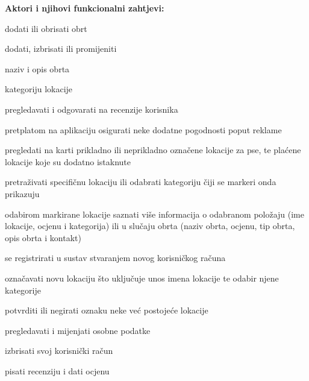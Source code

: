     \noindent \textbf{Aktori i njihovi funkcionalni zahtjevi:}
		\begin{packed_enum}
			\item  {}
			\begin{packed_enum}
				\item dodati ili obrisati obrt
                \item dodati, izbrisati ili promijeniti
				\begin{packed_enum}
					\item  naziv i opis obrta
					\item  kategoriju lokacije 
				\end{packed_enum}
                \item  pregledavati i odgovarati na recenzije korisnika
                \item  pretplatom na aplikaciju osigurati neke dodatne pogodnosti poput reklame
			\end{packed_enum}
                
            \item  {}
			\begin{packed_enum}
				\item pregledati na karti prikladno ili neprikladno označene lokacije za       pse, te plaćene lokacije koje su dodatno istaknute
                \item pretraživati specifičnu lokaciju ili odabrati kategoriju čiji se markeri onda prikazuju
                \item  odabirom markirane lokacije saznati više informacija o odabranom položaju (ime lokacije, ocjenu i  kategorija) ili u slučaju obrta (naziv obrta, ocjenu, tip obrta, opis obrta i kontakt)
                \item  se registrirati u sustav stvaranjem novog korisničkog računa
			\end{packed_enum}
            \eject

            \item  {}
			\begin{packed_enum}
				\item označavati novu lokaciju što uključuje unos imena lokacije te odabir njene kategorije
                \item potvrditi ili negirati oznaku neke već postojeće lokacije
                \item pregledavati i mijenjati osobne podatke
                \item izbrisati svoj korisnički račun
                \item pisati recenziju i dati ocjenu  
			\end{packed_enum}
				

\end{packed_enum}

